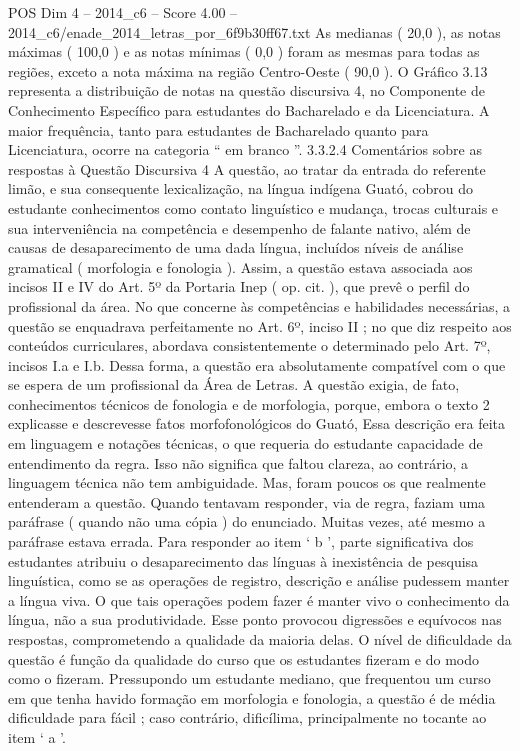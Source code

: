 \begin{textsample}{POS Dim 4 – 2014\_c6 – Score 4.00 – 2014\_c6/enade\_2014\_letras\_por\_6f9b30ff67.txt}
As medianas ( 20,0 ), as notas máximas ( 100,0 ) e as notas mínimas ( 0,0 ) foram as mesmas para todas as regiões, exceto a nota máxima na região Centro-Oeste ( 90,0 ).
O Gráfico 3.13 representa a distribuição de notas na questão discursiva 4, no Componente de Conhecimento Específico para estudantes do Bacharelado e da Licenciatura.
A maior frequência, tanto para estudantes de Bacharelado quanto para Licenciatura, ocorre na categoria “ em branco ”. 3.3.2.4 Comentários sobre as respostas à Questão Discursiva 4 A questão, ao tratar da entrada do referente limão, e sua consequente lexicalização, na língua indígena Guató, cobrou do estudante conhecimentos como contato linguístico e mudança, trocas culturais e sua interveniência na competência e desempenho de falante nativo, além de causas de desaparecimento de uma dada língua, incluídos níveis de análise gramatical ( morfologia e fonologia ).
Assim, a questão estava associada aos incisos II e IV do Art. 5º da Portaria Inep ( op. cit. ), que prevê o perfil do profissional da área.
No que concerne às competências e habilidades necessárias, a questão se enquadrava perfeitamente no Art. 6º, inciso II ; no que diz respeito aos conteúdos curriculares, abordava consistentemente o determinado pelo Art. 7º, incisos I.a e I.b.
Dessa forma, a questão era absolutamente compatível com o que se espera de um profissional da Área de Letras.
A questão exigia, de fato, conhecimentos técnicos de fonologia e de morfologia, porque, embora o texto 2 explicasse e descrevesse fatos morfofonológicos do Guató, Essa descrição era feita em linguagem e notações técnicas, o que requeria do estudante capacidade de entendimento da regra.
Isso não significa que faltou clareza, ao contrário, a linguagem técnica não tem ambiguidade.
Mas, foram poucos os que realmente entenderam a questão.
Quando tentavam responder, via de regra, faziam uma paráfrase ( quando não uma cópia ) do enunciado.
Muitas vezes, até mesmo a paráfrase estava errada.
Para responder ao item ‘ b ’, parte significativa dos estudantes atribuiu o desaparecimento das línguas à inexistência de pesquisa linguística, como se as operações de registro, descrição e análise pudessem manter a língua viva.
O que tais operações podem fazer é manter vivo o conhecimento da língua, não a sua produtividade.
Esse ponto provocou digressões e equívocos nas respostas, comprometendo a qualidade da maioria delas.
O nível de dificuldade da questão é função da qualidade do curso que os estudantes fizeram e do modo como o fizeram.
Pressupondo um estudante mediano, que frequentou um curso em que tenha havido formação em morfologia e fonologia, a questão é de média dificuldade para fácil ; caso contrário, dificílima, principalmente no tocante ao item ‘ a ’.

\end{textsample}
